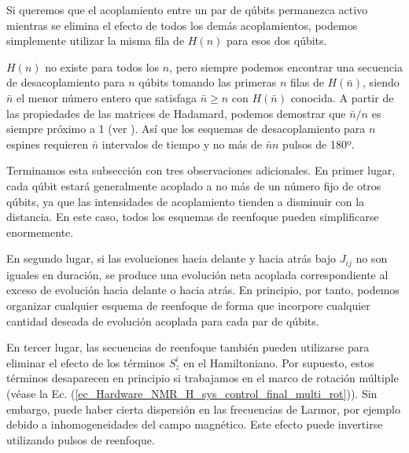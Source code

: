 \documentclass[a4paper,11pt]{book} %
\numberwithin{equation}{chapter}
\begin{document}
Si queremos que el acoplamiento entre un par de qúbits permanezca activo mientras se elimina el efecto de todos los demás acoplamientos, podemos simplemente utilizar la misma fila de $H(n)$ para esos dos qúbits. 

$H(n)$ no existe para todos los $n$, pero siempre podemos encontrar una secuencia de desacoplamiento para $n$ qúbits tomando las primeras $n$ filas de $H(\bar{n})$, siendo $\bar{n}$ el menor número entero que satisfaga $\bar{n} \geq n $ con $H(\bar{n})$ conocida. A partir de las propiedades de las matrices de Hadamard, podemos demostrar que $\bar{n}/n$ es siempre próximo a 1 (ver \cite{bib_Hardware_NMR_reenfoque_Hadammard_1}). Así que los esquemas de desacoplamiento para $n$ espines requieren $\bar{n}$ intervalos de tiempo y no más de $\bar{n}n$ pulsos de 180º.

Terminamos esta subsección con tres observaciones adicionales.
En primer lugar, cada qúbit estará generalmente acoplado a no más de un número fijo de otros qúbits, ya que las intensidades de acoplamiento tienden a disminuir con la distancia. En este caso, todos los esquemas de reenfoque pueden simplificarse enormemente. 

En segundo lugar, si las evoluciones hacia delante y hacia atrás bajo
$J_{ij}$ no son iguales en duración, se produce una evolución neta acoplada correspondiente al exceso de evolución hacia delante o hacia atrás. En principio, por tanto, podemos organizar cualquier esquema de reenfoque de forma que incorpore cualquier cantidad deseada de evolución acoplada para cada par de qúbits.

En tercer lugar, las secuencias de reenfoque también pueden utilizarse para eliminar el efecto de los términos $S_{z}^i$ en el Hamiltoniano. Por supuesto, estos términos desaparecen en principio si trabajamos en el marco de rotación múltiple (véase la Ec. (\ref{ec_Hardware_NMR_H_sys_control_final_multi_rot})). Sin embargo, puede haber cierta dispersión en las frecuencias de Larmor, por ejemplo debido a inhomogeneidades del campo magnético. Este efecto puede invertirse utilizando pulsos de reenfoque.


















	
\end{document}
